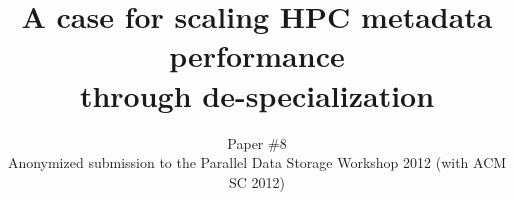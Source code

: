 \documentclass[10pt, conference]{IEEEtran}
\begin{document}
\date{}

\title{A case for scaling HPC metadata performance \\ through
de-specialization}

\author{
    \normalsize {Paper \#8} \\ 
    \normalsize {Anonymized submission to the Parallel Data Storage Workshop 2012 (with ACM SC 2012)}
}


\maketitle
%







\end{document}
